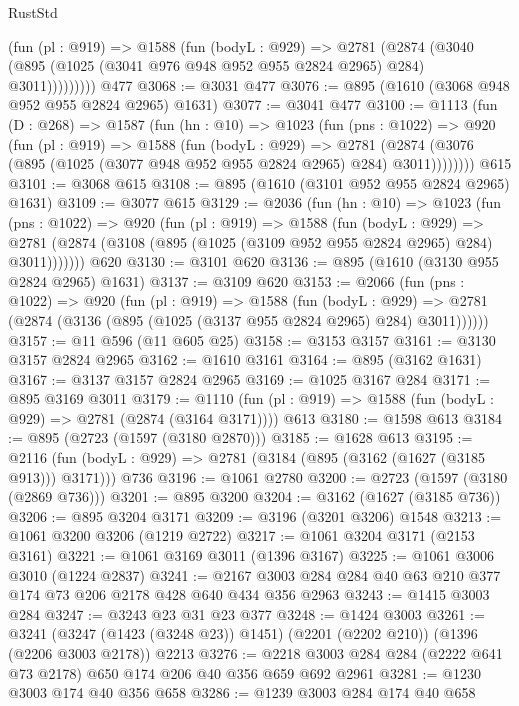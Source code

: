 \begin{lexlean}{RustStd}
\begin{coremodule}
{\begin{coremodule}
{{{{{{{{{            (fun (pl : @919) =>
            @1588
              (fun (bodyL : @929) =>
              @2781
                (@2874
                  (@3040 (@895 (@1025 (@3041 @976 @948 @952 @955 @2824 @2965) @284) @3011)))))))))
    @477
@3068 := @3031 @477
@3076 := @895 (@1610 (@3068 @948 @952 @955 @2824 @2965) @1631)
@3077 := @3041 @477
@3100 := @1113
    (fun (D : @268) =>
    @1587
      (fun (hn : @10) =>
      @1023
        (fun (pns : @1022) =>
        @920
          (fun (pl : @919) =>
          @1588
            (fun (bodyL : @929) =>
            @2781 (@2874 (@3076 (@895 (@1025 (@3077 @948 @952 @955 @2824 @2965) @284) @3011))))))))
    @615
@3101 := @3068 @615
@3108 := @895 (@1610 (@3101 @952 @955 @2824 @2965) @1631)
@3109 := @3077 @615
@3129 := @2036
    (fun (hn : @10) =>
    @1023
      (fun (pns : @1022) =>
      @920
        (fun (pl : @919) =>
        @1588
          (fun (bodyL : @929) =>
          @2781 (@2874 (@3108 (@895 (@1025 (@3109 @952 @955 @2824 @2965) @284) @3011)))))))
    @620
@3130 := @3101 @620
@3136 := @895 (@1610 (@3130 @955 @2824 @2965) @1631)
@3137 := @3109 @620
@3153 := @2066
    (fun (pns : @1022) =>
    @920
      (fun (pl : @919) =>
      @1588
        (fun (bodyL : @929) =>
        @2781 (@2874 (@3136 (@895 (@1025 (@3137 @955 @2824 @2965) @284) @3011))))))
@3157 := @11 @596 (@11 @605 @25)
@3158 := @3153 @3157
@3161 := @3130 @3157 @2824 @2965
@3162 := @1610 @3161
@3164 := @895 (@3162 @1631)
@3167 := @3137 @3157 @2824 @2965
@3169 := @1025 @3167 @284
@3171 := @895 @3169 @3011
@3179 := @1110 (fun (pl : @919) => @1588 (fun (bodyL : @929) => @2781 (@2874 (@3164 @3171)))) @613
@3180 := @1598 @613
@3184 := @895 (@2723 (@1597 (@3180 @2870)))
@3185 := @1628 @613
@3195 := @2116 (fun (bodyL : @929) => @2781 (@3184 (@895 (@3162 (@1627 (@3185 @913))) @3171))) @736
@3196 := @1061 @2780
@3200 := @2723 (@1597 (@3180 (@2869 @736)))
@3201 := @895 @3200
@3204 := @3162 (@1627 (@3185 @736))
@3206 := @895 @3204 @3171
@3209 := @3196 (@3201 @3206) @1548
@3213 := @1061 @3200 @3206 (@1219 @2722)
@3217 := @1061 @3204 @3171 (@2153 @3161)
@3221 := @1061 @3169 @3011 (@1396 @3167)
@3225 := @1061 @3006 @3010 (@1224 @2837)
@3241 := @2167 @3003 @284 @284 @40 @63 @210 @377 @174 @73 @206 @2178 @428 @640 @434 @356 @2963
@3243 := @1415 @3003 @284
@3247 := @3243 @23 @31 @23 @377
@3248 := @1424 @3003
@3261 := @3241
    (@3247 (@1423 (@3248 @23)) @1451)
    (@2201 (@2202 @210))
    (@1396 (@2206 @3003 @2178))
    @2213
@3276 := @2218 @3003 @284 @284 (@2222 @641 @73 @2178) @650 @174 @206 @40 @356 @659 @692 @2961
@3281 := @1230 @3003 @174 @40 @356 @658
@3286 := @1239 @3003 @284 @174 @40 @658
}}}}}}}}}
\end{coremodule}}
\end{coremodule}
\end{lexlean}
